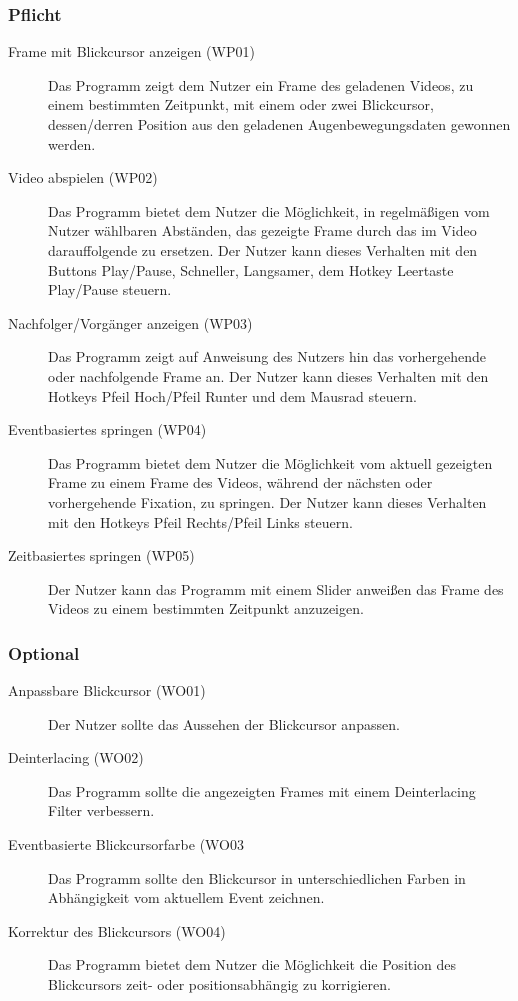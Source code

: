 \documentclass[a4paper]{scrartcl}
\begin{document}
    \subsubsection{Pflicht}
      \begin{description}
	\item[Frame mit Blickcursor anzeigen (WP01)] Das Programm zeigt dem Nutzer ein Frame des geladenen Videos, zu einem bestimmten Zeitpunkt, mit einem oder zwei Blickcursor, dessen/derren Position aus den geladenen Augenbewegungsdaten gewonnen werden.
	\item[Video abspielen (WP02)] Das Programm bietet dem Nutzer die Möglichkeit, in regelmäßigen vom Nutzer wählbaren Abständen, das gezeigte Frame durch das im Video darauffolgende zu ersetzen. Der Nutzer kann dieses Verhalten mit den Buttons Play/Pause, Schneller, Langsamer, dem Hotkey Leertaste Play/Pause steuern.
	\item[Nachfolger/Vorgänger anzeigen (WP03)] Das Programm zeigt auf Anweisung des Nutzers hin das vorhergehende oder nachfolgende Frame an. Der Nutzer kann dieses Verhalten mit den Hotkeys Pfeil Hoch/Pfeil Runter und dem Mausrad steuern.
	\item[Eventbasiertes springen (WP04)] Das Programm bietet dem Nutzer die Möglichkeit vom aktuell gezeigten Frame zu einem Frame des Videos, während der nächsten oder vorhergehende Fixation, zu springen. Der Nutzer kann dieses Verhalten mit den Hotkeys Pfeil Rechts/Pfeil Links steuern.
	\item[Zeitbasiertes springen (WP05)] Der Nutzer kann das Programm mit einem Slider anweißen das Frame des Videos zu einem bestimmten Zeitpunkt anzuzeigen.
      \end{description}
    \subsubsection{Optional}
      \begin{description}
	\item[Anpassbare Blickcursor (WO01)] Der Nutzer sollte das Aussehen der Blickcursor anpassen.
	\item[Deinterlacing (WO02)] Das Programm sollte die angezeigten Frames mit einem Deinterlacing Filter verbessern.
	\item[Eventbasierte Blickcursorfarbe (WO03] Das Programm sollte den Blickcursor in unterschiedlichen Farben in Abhängigkeit vom aktuellem Event zeichnen.
	\item[Korrektur des Blickcursors (WO04)] Das Programm bietet dem Nutzer die Möglichkeit die Position des Blickcursors zeit- oder positionsabhängig zu korrigieren.
      \end{description}
\end{document}
